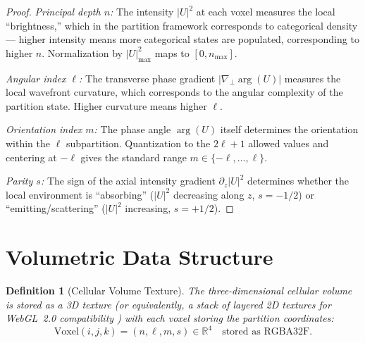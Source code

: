 \documentclass[11pt,twocolumn,a4paper]{article}
\newtheorem{definition}[theorem]{Definition}
\newcommand{\R}{\mathbb{R}}
\begin{document}
\begin{proof}
\textit{Principal depth $n$:} The intensity $|U|^2$ at each voxel
measures the local ``brightness,'' which in the partition framework
corresponds to categorical density --- higher intensity means more
categorical states are populated, corresponding to higher $n$.
Normalization by $|U|^2_{\max}$ maps to $[0, n_{\max}]$.

\textit{Angular index $\ell$:} The transverse phase gradient
$|\nabla_\perp \arg(U)|$ measures the local wavefront curvature,
which corresponds to the angular complexity of the partition state.
Higher curvature means higher $\ell$.

\textit{Orientation index $m$:} The phase angle $\arg(U)$ itself
determines the orientation within the $\ell$ subpartition. Quantization
to the $2\ell+1$ allowed values and centering at $-\ell$ gives the
standard range $m \in \{-\ell, \ldots, \ell\}$.

\textit{Parity $s$:} The sign of the axial intensity gradient
$\partial_z |U|^2$ determines whether the local environment is
``absorbing'' ($|U|^2$ decreasing along $z$, $s = -1/2$) or
``emitting/scattering'' ($|U|^2$ increasing, $s = +1/2$).
\end{proof}




\section{Volumetric Data Structure}
\label{sec:volumetric-data}

\begin{definition}[Cellular Volume Texture]
\label{def:volume-texture}
The three-dimensional cellular volume is stored as a 3D texture
(or equivalently, a stack of layered 2D textures for WebGL~2.0
compatibility \citep{khronos2024}) with each voxel storing the
partition coordinates:
\begin{equation}
\text{Voxel}(i,j,k) = (n, \ell, m, s) \in \R^4
  \quad \text{stored as RGBA32F}.
\label{eq:voxel}
\end{equation}
\end{definition}
\end{document}
